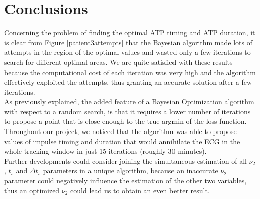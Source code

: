\documentclass[11pt,a4paper]{article}
\begin{document}
\section{Conclusions}
Concerning the problem of finding the optimal ATP timing and ATP duration, it is clear from Figure \ref{patient3attempts} that the Bayesian algorithm made lots of attempts in the region of the optimal values and wasted only a few iterations to search for different optimal areas. We are quite satisfied with these results because the computational cost of each iteration was very high and the algorithm effectively exploited the attempts, thus granting an accurate solution after a few iterations.\\
As previously explained, the added feature of a Bayesian Optimization algorithm with respect to a random search, is that it requires a lower number of iterations to propose a point that is close enough to the true argmin of the loss function. Throughout our project, we noticed that the algorithm was able to propose values of impulse timing and duration that would annihilate the ECG in the whole tracking window in just 15 iterations (roughly 30 minutes). \\
Further developments could consider joining the simultaneous estimation of all $\nu_2$, $t_s$ and $\Delta t_s$ parameters in a unique algorithm, because an inaccurate $\nu_2$ parameter could negatively influence the estimation of the other two variables, thus an optimized $\nu_2$ could lead us to obtain an even better result.
\end{document}
